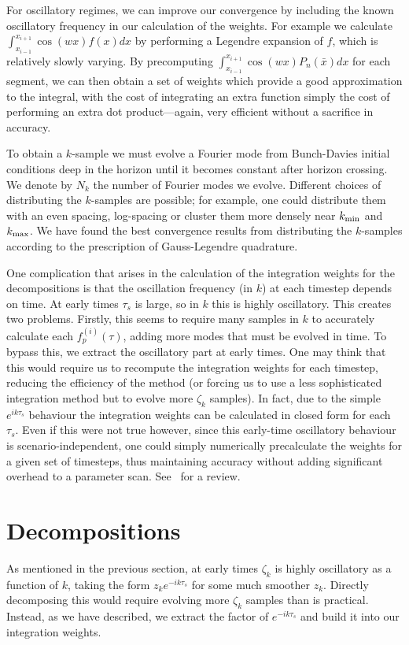     For oscillatory regimes, we can improve our convergence by including the known
    oscillatory frequency in our calculation of the weights. For example we calculate
    $\int_{x_{i-1}}^{x_{i+1}}\cos(wx)f(x)dx$ by performing a Legendre expansion of
    $f$, which is relatively slowly varying. By precomputing $\int_{x_{i-1}}^{x_{i+1}}\cos(wx)P_n(\bar{x})dx$
    for each segment, we can then obtain a set of weights which provide a good approximation
    to the integral, with the cost of integrating an extra function simply
    the cost of performing an extra dot product---again, very efficient without a
    sacrifice in accuracy.


To obtain a $k$-sample we must evolve a Fourier mode from Bunch-Davies initial conditions deep in the horizon
until it becomes constant after horizon crossing.
We denote by $N_k$ the number of Fourier modes we evolve.
Different choices of distributing the $k$-samples are possible; for example, one could distribute them
with an even spacing, log-spacing or cluster them more densely near ${k_\text{min}}$ and ${k_\text{max}}$.
We have found the best convergence results from distributing the $k$-samples
according to the prescription of Gauss-Legendre quadrature.


One complication that arises in the calculation of the integration weights for the decompositions
is that the oscillation frequency (in $k$) at each timestep depends on time.
At early times $\tau_s$ is large, so in $k$ this is highly oscillatory.
This creates two problems. Firstly, this seems to require many samples
in $k$ to accurately calculate each $f_p^{(i)} (\tau)$,
adding more modes that must be evolved in time.
To bypass this, we extract the oscillatory part at early times.
One may think that this would require us to recompute the integration weights for each timestep,
reducing the efficiency of the method (or forcing us to use a less sophisticated integration method
but to evolve more $\zeta_k$ samples). In fact, due to the simple $e^{ik\tau_s}$ behaviour the integration
weights can be calculated in closed form for each $\tau_s$. Even if this were not true however,
since this early-time oscillatory behaviour is scenario-independent, one could simply numerically precalculate the
weights for a given set of timesteps, thus maintaining accuracy without adding significant overhead to
a parameter scan.
See~\cite{Ringeval} for a review.


\section{Decompositions}
As mentioned in the previous section, at early times $\zeta_k$ is
highly oscillatory as a function of $k$,
taking the form $z_k e^{-ik\tau_s}$ for some much smoother $z_k$.
Directly decomposing this would require evolving more $\zeta_k$ samples
than is practical. Instead, as we have described, we extract the factor of $e^{-ik\tau_s}$
and build it into our integration weights.


